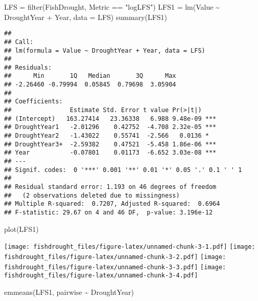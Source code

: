 \documentclass[
]{article}
\newenvironment{Shaded}{\begin{snugshade}}{\end{snugshade}}
\newcommand{\AttributeTok}[1]{\textcolor[rgb]{0.77,0.63,0.00}{#1}}
\newcommand{\FunctionTok}[1]{\textcolor[rgb]{0.00,0.00,0.00}{#1}}
\newcommand{\NormalTok}[1]{#1}
\newcommand{\OtherTok}[1]{\textcolor[rgb]{0.56,0.35,0.01}{#1}}
\newcommand{\SpecialCharTok}[1]{\textcolor[rgb]{0.00,0.00,0.00}{#1}}
\newcommand{\StringTok}[1]{\textcolor[rgb]{0.31,0.60,0.02}{#1}}
\begin{document}
\begin{Shaded}
\begin{Highlighting}[]
\NormalTok{LFS }\OtherTok{=} \FunctionTok{filter}\NormalTok{(FishDrought, Metric }\SpecialCharTok{==} \StringTok{"logLFS"}\NormalTok{)}
\NormalTok{LFS1 }\OtherTok{=} \FunctionTok{lm}\NormalTok{(Value }\SpecialCharTok{\textasciitilde{}}\NormalTok{ DroughtYear }\SpecialCharTok{+}\NormalTok{ Year, }\AttributeTok{data =}\NormalTok{ LFS)}
\FunctionTok{summary}\NormalTok{(LFS1)}
\end{Highlighting}
\end{Shaded}

\begin{verbatim}
## 
## Call:
## lm(formula = Value ~ DroughtYear + Year, data = LFS)
## 
## Residuals:
##      Min       1Q   Median       3Q      Max 
## -2.26460 -0.79994  0.05845  0.79698  3.05904 
## 
## Coefficients:
##                Estimate Std. Error t value Pr(>|t|)    
## (Intercept)   163.27414   23.36338   6.988 9.48e-09 ***
## DroughtYear1   -2.01296    0.42752  -4.708 2.32e-05 ***
## DroughtYear2   -1.43022    0.55741  -2.566   0.0136 *  
## DroughtYear3+  -2.59382    0.47521  -5.458 1.86e-06 ***
## Year           -0.07801    0.01173  -6.652 3.03e-08 ***
## ---
## Signif. codes:  0 '***' 0.001 '**' 0.01 '*' 0.05 '.' 0.1 ' ' 1
## 
## Residual standard error: 1.193 on 46 degrees of freedom
##   (2 observations deleted due to missingness)
## Multiple R-squared:  0.7207, Adjusted R-squared:  0.6964 
## F-statistic: 29.67 on 4 and 46 DF,  p-value: 3.196e-12
\end{verbatim}

\begin{Shaded}
\begin{Highlighting}[]
\FunctionTok{plot}\NormalTok{(LFS1)}
\end{Highlighting}
\end{Shaded}

\texttt{[image: fishdrought\_files/figure-latex/unnamed-chunk-3-1.pdf]}
\texttt{[image: fishdrought\_files/figure-latex/unnamed-chunk-3-2.pdf]}
\texttt{[image: fishdrought\_files/figure-latex/unnamed-chunk-3-3.pdf]}
\texttt{[image: fishdrought\_files/figure-latex/unnamed-chunk-3-4.pdf]}

\begin{Shaded}
\begin{Highlighting}[]
\FunctionTok{emmeans}\NormalTok{(LFS1, pairwise }\SpecialCharTok{\textasciitilde{}}\NormalTok{ DroughtYear)}
\end{Highlighting}
\end{Shaded}
\end{document}

